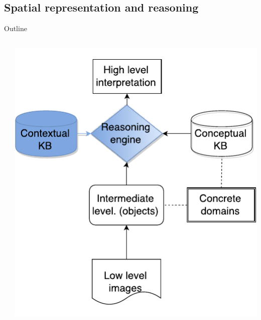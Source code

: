 \documentclass{beamer}
\begin{document}
\subsection{Spatial representation and reasoning}
\begin{frame}{Outline}
\begin{columns}
 \begin{column}{0.6\textwidth}
  \tableofcontents[currentsection,hideothersubsections,subsectionstyle=show/shaded]
 \end{column}

 \begin{column}{.4\textwidth}
  \includegraphics[width=.9\textwidth]{images/flowchart_sr_crop.pdf}
 \end{column}
\end{columns}
\end{frame}
\end{document}
